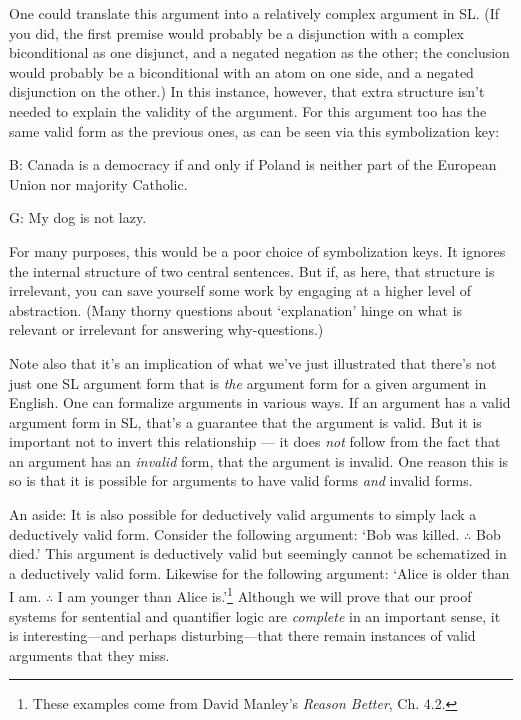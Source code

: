 One could translate this argument into a relatively complex argument in SL. (If you did, the first premise would probably be a disjunction with a complex biconditional as one disjunct, and a negated negation as the other; the conclusion would probably be a biconditional with an atom on one side, and a negated disjunction on the other.) In this instance, however, that extra structure isn't needed to explain the validity of the argument. For this argument too has the same valid form as the previous ones, as can be seen via this symbolization key:

\begin{ekey}
\item[B:] Canada is a democracy if and only if Poland is neither part of the European Union nor majority Catholic.
\item[G:] My dog is not lazy.
\end{ekey}

For many purposes, this would be a poor choice of symbolization keys. It ignores the internal structure of two central sentences. But if, as here, that structure is irrelevant, you can save yourself some work by engaging at a higher level of abstraction. {\color{black}(Many thorny questions about `explanation' hinge on what is relevant or irrelevant for answering why-questions.)}

Note also that it's an implication of what we've just illustrated that there's not just one SL argument form that is \emph{the} argument form for a given argument in English. One can formalize arguments in various ways. If an argument has a valid argument form in SL, that's a guarantee that the argument is valid. But it is important not to invert this relationship --- it does \emph{not} follow from the fact that an argument has an \emph{invalid} form, that the argument is invalid. One reason this is so is that it is possible for arguments to have valid forms \emph{and} invalid forms.

{\color{black} An aside: It is also possible for deductively valid arguments to simply lack a deductively valid form. Consider the following argument: `Bob was killed. $\therefore$ Bob died.' This argument is deductively valid but seemingly cannot be schematized in a deductively valid form. Likewise for the following argument: `Alice is older than I am. $\therefore$ I am younger than Alice is.'}\footnote{These examples come from David Manley's \textit{Reason Better}, Ch. 4.2.} {\color{black}Although we will prove that our proof systems for sentential and quantifier logic are \textit{complete} in an important sense, it is interesting---and perhaps disturbing---that there remain instances of valid arguments that they miss.} 

